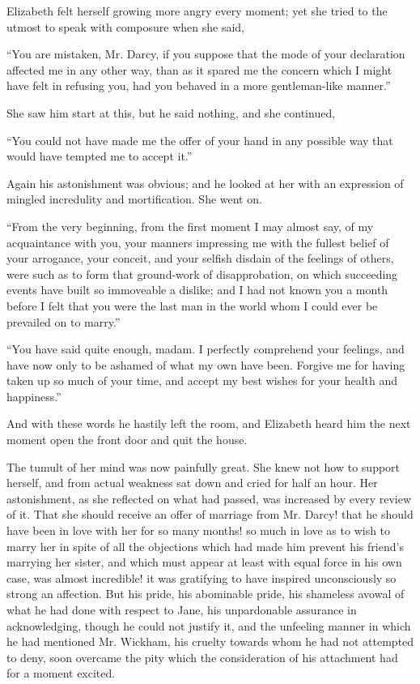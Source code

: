 Elizabeth felt herself growing more angry every moment;
yet she tried to the utmost to speak with composure when
she said,

“You are mistaken, Mr. Darcy, if you suppose that
the mode of your declaration affected me in any other
way, than as it spared me the concern which I might
have felt in refusing you, had you behaved in a more
gentleman-like manner.”

She saw him start at this, but he said nothing, and she
continued,

“You could not have made me the offer of your hand
in any possible way that would have tempted me to
accept it.”

Again his astonishment was obvious; and he looked
at her with an expression of mingled incredulity and
mortification. She went on.

“From the very beginning, from the first moment
I may almost say, of my acquaintance with you, your
manners impressing me with the fullest belief of your
arrogance, your conceit, and your selfish disdain of the
feelings of others, were such as to form that ground-work
of disapprobation, on which succeeding events have built
so immoveable a dislike; and I had not known you a
month before I felt that you were the last man in the
world whom I could ever be prevailed on to marry.”

“You have said quite enough, madam. I perfectly
comprehend your feelings, and have now only to be
ashamed of what my own have been. Forgive me for
having taken up so much of your time, and accept my
best wishes for your health and happiness.”

And with these words he hastily left the room, and
Elizabeth heard him the next moment open the front door
and quit the house.

The tumult of her mind was now painfully great. She
knew not how to support herself, and from actual weakness
sat down and cried for half an hour. Her astonishment,
as she reflected on what had passed, was increased by
every review of it. That she should receive an offer of
marriage from Mr. Darcy! that he should have been in
love with her for so many months! so much in love
as to wish to marry her in spite of all the objections which
had made him prevent his friend’s marrying her sister, and
which must appear at least with equal force in his own case,
was almost incredible! it was gratifying to have inspired
unconsciously so strong an affection. But his pride, his
abominable pride, his shameless avowal of what he had
done with respect to Jane, his unpardonable assurance
in acknowledging, though he could not justify it, and the
unfeeling manner in which he had mentioned Mr.
Wickham, his cruelty towards whom he had not attempted to
deny, soon overcame the pity which the consideration of
his attachment had for a moment excited.

